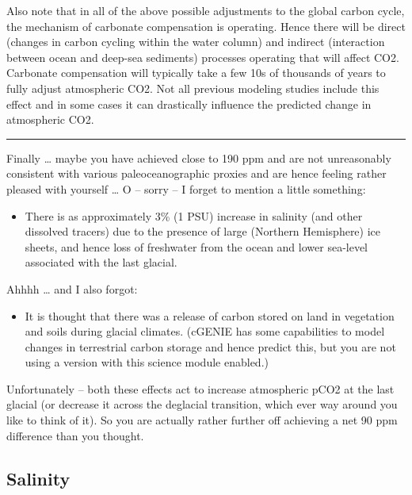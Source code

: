 \documentclass[11pt,fleqn]{book} %
\begin{document}
Also note that in all of the above possible adjustments to the global carbon cycle, the mechanism
of carbonate compensation is operating. Hence there will be direct (changes in carbon cycling
within the water column) and indirect (interaction between ocean and deep-sea sediments)
processes operating that will affect CO2. Carbonate compensation will typically take a few 10s of
thousands of years to fully adjust atmospheric CO2. Not all previous modeling studies include this
effect and in some cases it can drastically influence the predicted change in atmospheric CO2.

\vspace{1mm}
\noindent\rule{4cm}{0.5pt}
\vspace{2mm}

Finally … maybe you have achieved close to 190 ppm and are not unreasonably consistent with
various paleoceanographic proxies and are hence feeling rather pleased with yourself … O -- sorry -- I forget to mention a little something:

\begin{itemize}[noitemsep]
\setlength{\itemindent}{.2in}
\item 
There is as approximately 3\% (1 PSU) increase in salinity (and other dissolved tracers)
due to the presence of large (Northern Hemisphere) ice sheets, and hence loss of
freshwater from the ocean and lower sea-level associated with the last glacial.
\end{itemize}

\noindent Ahhhh … and I also forgot:

\begin{itemize}[noitemsep]
\setlength{\itemindent}{.2in}
\item It is thought that there was a release of carbon stored on land in vegetation and soils during
glacial climates. (cGENIE has some capabilities to model changes in terrestrial carbon
storage and hence predict this, but you are not using a version with this science module
enabled.)
\end{itemize}

Unfortunately – both these effects act to increase atmospheric pCO2 at the last glacial (or decrease
it across the deglacial transition, which ever way around you like to think of it). So you are actually
rather further off achieving a net 90 ppm difference than you thought.

%
\subsection{Salinity}
\end{document}
